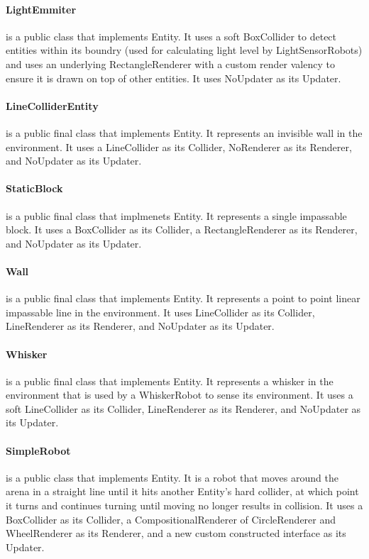 \paragraph{LightEmmiter} is a public class that implements Entity. It uses a soft BoxCollider to detect entities within its boundry (used for calculating light level by LightSensorRobots) and uses an underlying RectangleRenderer with a custom render valency to ensure it is drawn on top of other entities. It uses NoUpdater as its Updater.

\paragraph{LineColliderEntity} is a public final class that implements Entity. It represents an invisible wall in the environment. It uses a LineCollider as its Collider, NoRenderer as its Renderer, and NoUpdater as its Updater.

\paragraph{StaticBlock} is a public final class that implmenets Entity. It represents a single impassable block. It uses a BoxCollider as its Collider, a RectangleRenderer as its Renderer, and NoUpdater as its Updater.

\paragraph{Wall} is a public final class that implements Entity. It represents a point to point linear impassable line in the environment. It uses LineCollider as its Collider, LineRenderer as its Renderer, and NoUpdater as its Updater.

\paragraph{Whisker} is a public final class that implements Entity. It represents a whisker in the environment that is used by a WhiskerRobot to sense its environment. It uses a soft LineCollider as its Collider, LineRenderer as its Renderer, and NoUpdater as its Updater.

\paragraph{SimpleRobot} is a public class that implements Entity. It is a robot that moves around the arena in a straight line until it hits another Entity's hard collider, at which point it turns and continues turning until moving no longer results in collision. It uses a BoxCollider as its Collider, a CompositionalRenderer of CircleRenderer and WheelRenderer as its Renderer, and a new custom constructed interface as its Updater.

